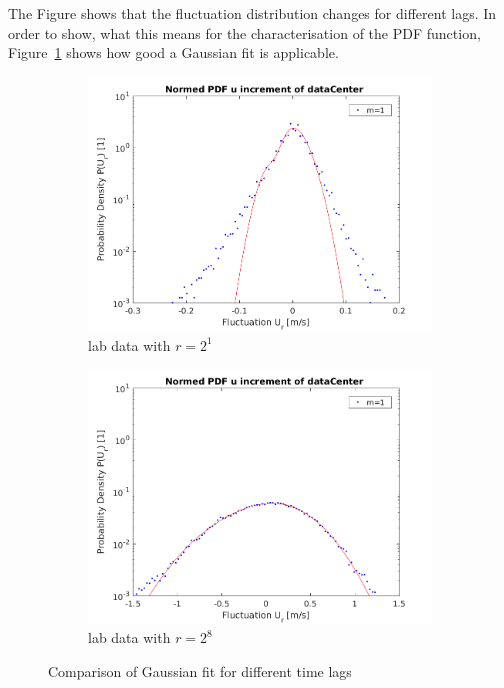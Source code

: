\documentclass[12pt]{article}
\begin{document}
The Figure shows that the fluctuation distribution changes for different lags. In order to show, what this means for the characterisation of the PDF function, Figure~\ref{fig:comparison_pdf_incr_18} shows how good a Gaussian fit is applicable.

\begin{figure}[H]
\begin{subfigure}{0.5\textwidth}
  \centering
  \includegraphics[width=1\linewidth]{figures/pdf_increments_center_normed_1.png}
  \caption{lab data with $r = 2^1$}
\end{subfigure}
\begin{subfigure}{0.5\textwidth}
  \centering
  \includegraphics[width=1\linewidth]{figures/pdf_increments_center_normed_8.png}
  \caption{lab data with $r = 2^8$}
\end{subfigure}
\caption{Comparison of Gaussian fit for different time lags}
\label{fig:comparison_pdf_incr_18}
\end{figure}
\end{document}
